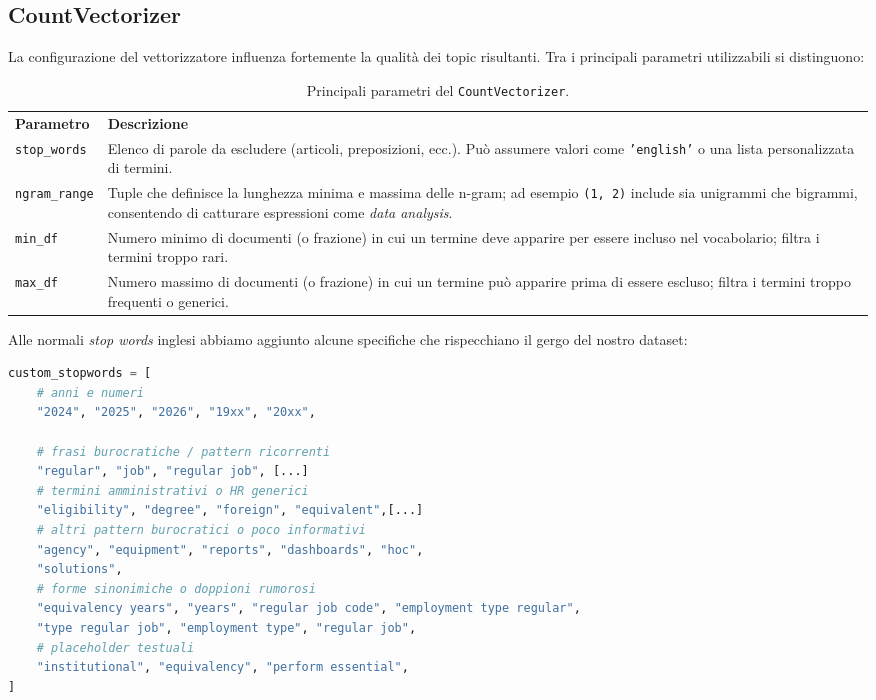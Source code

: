 \subsection{CountVectorizer}

\noindent La configurazione del vettorizzatore influenza fortemente la qualità dei topic risultanti. 
Tra i principali parametri utilizzabili si distinguono:

\begin{table}[H]
\centering
\begin{tabular}{p{3cm} p{9cm}}
\textbf{Parametro} & \textbf{Descrizione} \\
\texttt{stop\_words} & Elenco di parole da escludere (articoli, preposizioni, ecc.). Può assumere valori come \texttt{'english'} o una lista personalizzata di termini. \\
\texttt{ngram\_range} & Tuple che definisce la lunghezza minima e massima delle n-gram; ad esempio \texttt{(1, 2)} include sia unigrammi che bigrammi, consentendo di catturare espressioni come \textit{data analysis}. \\
\texttt{min\_df} & Numero minimo di documenti (o frazione) in cui un termine deve apparire per essere incluso nel vocabolario; filtra i termini troppo rari. \\
\texttt{max\_df} & Numero massimo di documenti (o frazione) in cui un termine può apparire prima di essere escluso; filtra i termini troppo frequenti o generici. \\
\end{tabular}
\caption{Principali parametri del \texttt{CountVectorizer}.}
\end{table}

\noindent Alle normali \emph{stop words} inglesi abbiamo aggiunto alcune specifiche che rispecchiano il gergo del nostro dataset:

\begin{lstlisting}[language=Python]
custom_stopwords = [
    # anni e numeri
    "2024", "2025", "2026", "19xx", "20xx",

    # frasi burocratiche / pattern ricorrenti
    "regular", "job", "regular job", [...]
    # termini amministrativi o HR generici
    "eligibility", "degree", "foreign", "equivalent",[...]
    # altri pattern burocratici o poco informativi
    "agency", "equipment", "reports", "dashboards", "hoc",
    "solutions",
    # forme sinonimiche o doppioni rumorosi
    "equivalency years", "years", "regular job code", "employment type regular",
    "type regular job", "employment type", "regular job",
    # placeholder testuali
    "institutional", "equivalency", "perform essential",
]
\end{lstlisting}
